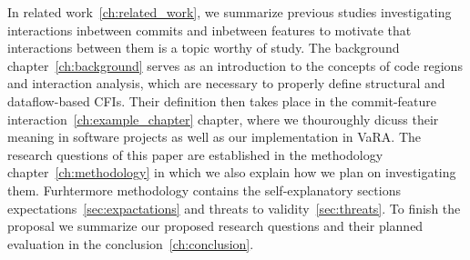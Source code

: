 In related work~\ref{ch:related_work}, we summarize previous studies investigating interactions inbetween commits and inbetween features to motivate that interactions between them is a topic worthy of study.
The background chapter~\ref{ch:background} serves as an introduction to the concepts of code regions and interaction analysis, which are necessary to properly define structural and dataflow-based CFIs.
Their definition then takes place in the commit-feature interaction~\ref{ch:example_chapter} chapter, where we thouroughly dicuss their meaning in software projects as well as our implementation in VaRA.
The research questions of this paper are established in the methodology chapter~\ref{ch:methodology} in which we also explain how we plan on investigating them.
Furhtermore methodology contains the self-explanatory sections expectations~\ref{sec:expactations} and threats to validity~\ref{sec:threats}.
To finish the proposal we summarize our proposed research questions and their planned evaluation in the conclusion~\ref{ch:conclusion}.

